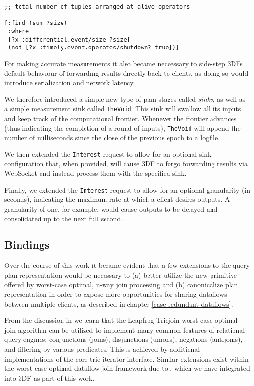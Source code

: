 \documentclass[../index.tex]{subfiles}
\begin{document}
\begin{verbatim}
;; total number of tuples arranged at alive operators

[:find (sum ?size)
 :where
 [?x :differential.event/size ?size]
 (not [?x :timely.event.operates/shutdown? true])]
\end{verbatim}

For making accurate measurements it also became neccessary to
side-step 3DFs default behaviour of forwarding results directly back
to clients, as doing so would introduce serialization and network
latency.

We therefore introduced a simple new type of plan stages called
\emph{sinks}, as well as a simple measurement sink called
\texttt{TheVoid}. This sink will swallow all its inputs and keep track
of the computational frontier. Whenever the frontier advances (thus
indicating the completion of a round of inputs), \texttt{TheVoid} will
append the number of milliseconds since the close of the previous
epoch to a logfile.

We then extended the \texttt{Interest} request to allow for an
optional sink configuration that, when provided, will cause 3DF to
forgo forwarding results via WebSocket and instead process them with
the specified sink.

Finally, we extended the \texttt{Interest} request to allow for an
optional granularity (in seconds), indicating the maximum rate at
which a client desires outputs. A granularity of one, for example,
would cause outputs to be delayed and consolidated up to the next full
second.

\subsection{Bindings} \label{bindings}

Over the course of this work it became evident that a few extensions
to the query plan representation would be necessary to (a) better
utilize the new primitive offered by worst-case optimal, n-way join
processing and (b) canonicalize plan representation in order to expose
more opportunities for sharing dataflows between multiple clients, as
described in chapter \ref{case-redundant-dataflows}.

From the discussion in \cite{veldhuizen2012leapfrog} we learn that the
Leapfrog Triejoin worst-case optimal join algorithm can be utilized to
implement many common features of relational query engines:
conjunctions (joins), disjunctions (unions), negations (antijoins),
and filtering by various predicates. This is achieved by additional
implementations of the core trie iterator interface. Similar
extensions exist within the worst-case optimal dataflow-join framework
due to \cite{ammar2018distributed}, which we have integrated into 3DF
as part of this work.
\end{document}
